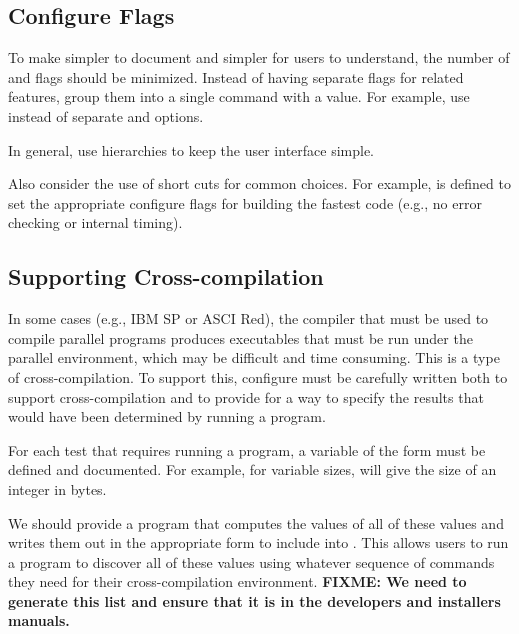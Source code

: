 \documentclass{article}
\def\fixme#1{\marginpar{FIXME:}\textbf{FIXME: #1}}
\begin{document}
\subsection{Configure Flags}
\label{sec:config-flags}
To make  simpler to document and simpler for users to
understand, the number of  and  flags should be
minimized.  Instead of having separate  flags for related
features, group them into a single  command with a value.
For example, use  instead of separate
 and  options.  

In general, use hierarchies to keep the user interface simple.

Also consider the use of short cuts for common choices.  For example, 
 is defined to set the appropriate configure
flags for building the fastest code (e.g., no error checking or
internal timing).

\subsection{Supporting Cross-compilation}
\label{sec:cross-compile}
In some cases (e.g., IBM SP or ASCI Red), the compiler that must be used to
compile parallel programs produces executables that must be run under
the parallel environment, which may be difficult and time consuming.
This is a type of cross-compilation.  To support this, configure must
be carefully written both to support cross-compilation and to provide
for a way to specify the results that would have been determined by
running a program.

For each test that requires running a program, a variable of the form
 must be defined and documented.  For example, for
variable sizes,  will give the size of an
integer in bytes.

We should provide a program that computes the values of all of these
values and writes them out in the appropriate form to include into
.  This allows users to run a program to discover all
of these values using whatever sequence of commands they need for
their cross-compilation environment.
\fixme{We need to generate this list and ensure that it is in the
  developers and installers manuals.}
\end{document}
